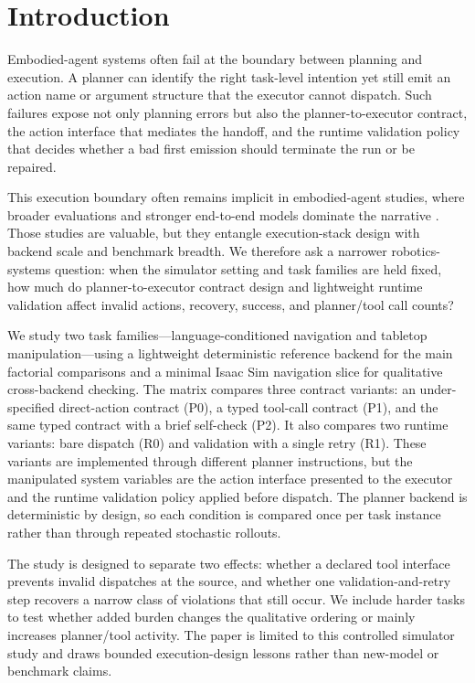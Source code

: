 \section{Introduction}

Embodied-agent systems often fail at the boundary between planning and
execution. A planner can identify the right task-level intention yet still emit
an action name or argument structure that the executor cannot dispatch. Such
failures expose not only planning errors but also the planner-to-executor
contract, the action interface that mediates the handoff, and the runtime
validation policy that decides whether a bad first emission should terminate
the run or be repaired.

This execution boundary often remains implicit in embodied-agent studies, where
broader evaluations and stronger end-to-end models dominate the narrative
\cite{driess2023palme,brohan2023rt2,yang2025embodiedbench,lu2025isbench,kachaev2025mindmotionaligned}.
Those studies are valuable, but they entangle execution-stack design with
backend scale and benchmark breadth. We therefore ask a narrower
robotics-systems question: when the simulator setting and task families are
held fixed, how much do planner-to-executor contract design and lightweight
runtime validation affect invalid actions, recovery, success, and
planner/tool call counts?

We study two task families---language-conditioned navigation and
tabletop manipulation---using a lightweight deterministic reference backend for
the main factorial comparisons and a minimal Isaac Sim navigation slice for qualitative cross-backend checking. The matrix compares three contract variants: an
under-specified direct-action contract (P0), a typed tool-call contract
(P1), and the same typed contract with a brief self-check (P2). It also
compares two runtime variants: bare dispatch (R0) and validation with a
single retry (R1). These variants are implemented through different planner
instructions, but the manipulated system variables are the action interface
presented to the executor and the runtime validation policy applied before
dispatch. The planner backend is deterministic by design, so each
condition is compared once per task instance rather than through repeated
stochastic rollouts.

The study is designed to separate two effects: whether a declared tool
interface prevents invalid dispatches at the source, and whether one
validation-and-retry step recovers a narrow class of violations that still
occur. We include harder tasks to test whether added burden changes the
qualitative ordering or mainly increases planner/tool activity. The paper is
limited to this controlled simulator study and draws bounded execution-design
lessons rather than new-model or benchmark claims.

